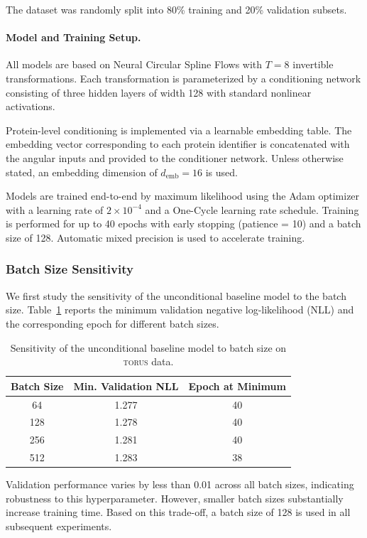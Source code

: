 \documentclass{article}
\begin{document}
The dataset was randomly split into 80\% training and 20\% validation subsets.

\paragraph{Model and Training Setup.}
All models are based on Neural Circular Spline Flows with $T=8$ invertible transformations. Each transformation is parameterized by a conditioning network consisting of three hidden layers of width 128 with standard nonlinear activations.

Protein-level conditioning is implemented via a learnable embedding table. The embedding vector corresponding to each protein identifier is concatenated with the angular inputs and provided to the conditioner network. Unless otherwise stated, an embedding dimension of $d_{\mathrm{emb}} = 16$ is used.

Models are trained end-to-end by maximum likelihood using the Adam optimizer with a learning rate of $2\times10^{-4}$ and a One-Cycle learning rate schedule. Training is performed for up to 40 epochs with early stopping (patience = 10) and a batch size of 128. Automatic mixed precision is used to accelerate training.


\subsubsection{Batch Size Sensitivity}
We first study the sensitivity of the unconditional baseline model to the batch size. Table~\ref{tab:batch_size} reports the minimum validation negative log-likelihood (NLL) and the corresponding epoch for different batch sizes.

\begin{table}[t]
\centering
\caption{Sensitivity of the unconditional baseline model to batch size on \textsc{torus}  data.}
\label{tab:batch_size}
\begin{tabular}{ccc}
\toprule
Batch Size & Min. Validation NLL & Epoch at Minimum \\
\midrule
64  & 1.277 & 40 \\
128 & 1.278 & 40 \\
256 & 1.281 & 40 \\
512 & 1.283 & 38 \\
\bottomrule
\end{tabular}
\end{table}

Validation performance varies by less than 0.01 across all batch sizes, indicating robustness to this hyperparameter. However, smaller batch sizes substantially increase training time. Based on this trade-off, a batch size of 128 is used in all subsequent experiments.
\end{document}
